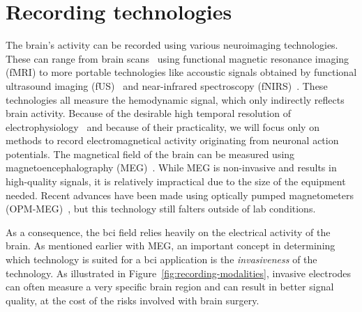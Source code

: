 


\section{Recording technologies}
\label{sec:bci-recording}


The brain's activity can be recorded using various neuroimaging
technologies.
These can range from brain scans~\cite{Weiskopf2004} using functional magnetic resonance imaging
(fMRI) to more portable technologies like accoustic signals obtained by functional ultrasound imaging
(fUS)~\cite{Zheng2023} and near-infrared spectroscopy
(fNIRS)~\cite{Borgheai2020}.
These technologies all measure the hemodynamic signal, which only indirectly
reflects brain activity.
Because of the desirable high temporal resolution of
electrophysiology~\cite{Easttom2021} and
because of their practicality, we will focus only on methods to record
electromagnetical activity originating from neuronal action potentials.
The magnetical field of the brain can be measured using magnetoencephalography
(MEG)~\cite{Mellinger2007}.
While MEG is non-invasive and results in high-quality signals, it is relatively
impractical due to the size of the equipment needed.
Recent advances have been made using optically pumped magnetometers
(OPM-MEG)~\cite{Wittevrongel2021}, but this technology still falters outside of
lab conditions.

As a consequence, the \ac{bci} field relies heavily on the
electrical activity of the brain.
As mentioned earlier with MEG, an important concept in determining which
technology is suited for a \ac{bci} application is the \emph{invasiveness} of the technology.
As illustrated in Figure~\ref{fig:recording-modalities}, invasive electrodes can often measure a very specific brain region and can result in better signal quality, at the cost of the risks
involved with brain surgery.

